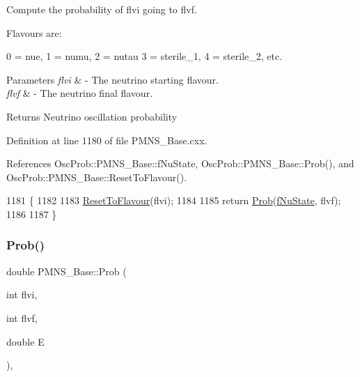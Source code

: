 Compute the probability of flvi going to flvf.

Flavours are\+: 
\begin{DoxyPre}
  0 = nue, 1 = numu, 2 = nutau
  3 = sterile\_1, 4 = sterile\_2, etc.
\end{DoxyPre}
 
\begin{DoxyParams}{Parameters}
{\em flvi} & -\/ The neutrino starting flavour. \\
\hline
{\em flvf} & -\/ The neutrino final flavour.\\
\hline
\end{DoxyParams}
\begin{DoxyReturn}{Returns}
Neutrino oscillation probability 
\end{DoxyReturn}


Definition at line 1180 of file P\+M\+N\+S\+\_\+\+Base.\+cxx.



References Osc\+Prob\+::\+P\+M\+N\+S\+\_\+\+Base\+::f\+Nu\+State, Osc\+Prob\+::\+P\+M\+N\+S\+\_\+\+Base\+::\+Prob(), and Osc\+Prob\+::\+P\+M\+N\+S\+\_\+\+Base\+::\+Reset\+To\+Flavour().


\begin{DoxyCode}
1181 \{
1182 
1183   \hyperlink{classOscProb_1_1PMNS__Base_ac0d4bf8ff1318ef96d3dafa62e0cec25}{ResetToFlavour}(flvi);
1184 
1185   \textcolor{keywordflow}{return} \hyperlink{classOscProb_1_1PMNS__Base_aa2e10704d2d205a1ec8988de14b1a66f}{Prob}(\hyperlink{classOscProb_1_1PMNS__Base_abf99f2339e3ee989600740b5d88063e8}{fNuState}, flvf);
1186 
1187 \}
\end{DoxyCode}
\mbox{\label{classOscProb_1_1PMNS__Base_aa3cee10639d5c0879ccb9e78d62128d3}} 
\subsubsection{\texorpdfstring{Prob()}{Prob()}\hspace{0.1cm}{\footnotesize\ttfamily [5/6]}}
{\footnotesize\ttfamily double P\+M\+N\+S\+\_\+\+Base\+::\+Prob (\begin{DoxyParamCaption}\item[{int}]{flvi,  }\item[{int}]{flvf,  }\item[{double}]{E }\end{DoxyParamCaption})\hspace{0.3cm}{\ttfamily [virtual]}, {\ttfamily [inherited]}}

